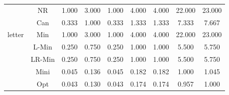 \documentclass[11pt]{book}
\begin{document}
\begin{table}
\begin{tabular}{|c|c|c|c|c|c|c|c|c|}
    \hline
    \multirow{5}{*}{letter}
         & NR & 1.000 & 3.000 & 1.000 & 4.000 & 4.000 & 22.000 & 23.000 \\                                                                                                                                           
         & Can & 0.333 & 1.000 & 0.333 & 1.333 & 1.333 & 7.333 & 7.667 \\                                                                                                                                            
         & Min & 1.000 & 3.000 & 1.000 & 4.000 & 4.000 & 22.000 & 23.000 \\                                                                                                                                          
         & L-Min & 0.250 & 0.750 & 0.250 & 1.000 & 1.000 & 5.500 & 5.750 \\                                                                                                                                          
         & LR-Min & 0.250 & 0.750 & 0.250 & 1.000 & 1.000 & 5.500 & 5.750 \\                                                                                                                                         
         & Mini & 0.045 & 0.136 & 0.045 & 0.182 & 0.182 & 1.000 & 1.045 \\                                                                                                                                           
         & Opt & 0.043 & 0.130 & 0.043 & 0.174 & 0.174 & 0.957 & 1.000 \\
	

\end{tabular}
\end{table}
\end{document}
